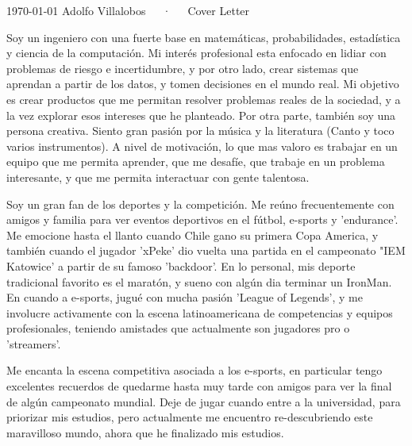 \documentclass[11pt, a4paper]{awesome-cv}
\begin{document}
\makecvheader[R]

\makecvfooter
  {\today}
  {Adolfo Villalobos~~~·~~~Cover Letter}
  {}

\makelettertitle

\begin{cvletter}



Soy un ingeniero con una fuerte base en matemáticas, probabilidades, estadística y ciencia de la computación.
Mi interés profesional esta enfocado en lidiar con problemas de riesgo e incertidumbre, y por otro lado,
crear sistemas que aprendan a partir de los datos, y tomen decisiones en el mundo real. Mi objetivo es crear productos
que me permitan resolver problemas reales de la sociedad, y a la vez explorar esos intereses que he planteado.
Por otra parte, también soy una persona creativa. Siento gran pasión por la música y la literatura (Canto y toco varios instrumentos).
A nivel de motivación, lo que mas valoro es trabajar en un equipo que me permita aprender, que me desafíe, que trabaje en un problema interesante,
y que me permita interactuar con gente talentosa.

Soy un gran fan de los deportes y la competición. Me reúno frecuentemente con amigos y familia para ver eventos deportivos en el fútbol, e-sports y 'endurance'.
Me emocione hasta el llanto cuando Chile gano su primera Copa America, y también cuando el jugador 'xPeke' dio vuelta una partida en el campeonato
"IEM Katowice' a partir de su famoso 'backdoor'. En lo personal, mis deporte tradicional favorito es el maratón, y sueno
con algún dia terminar un IronMan. En cuando a e-sports, jugué con mucha pasión 'League of Legends', y me involucre activamente con la escena latinoamericana
de competencias y equipos profesionales, teniendo amistades que actualmente son jugadores pro o 'streamers'. 

Me encanta la escena competitiva asociada a los e-sports, en particular tengo excelentes recuerdos de quedarme hasta muy tarde con amigos para ver la final
de algún campeonato mundial. Deje de jugar cuando entre a la universidad, para priorizar mis estudios, pero actualmente me encuentro re-descubriendo este
maravilloso mundo, ahora que he finalizado mis estudios.


\end{cvletter}
\end{document}
